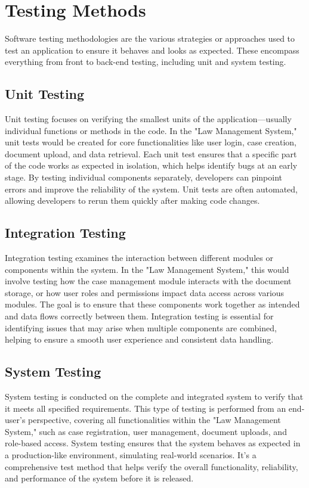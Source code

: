 \section{Testing Methods}

Software testing methodologies are the various strategies or approaches used to test an application to ensure it behaves and looks as expected. These encompass everything from front to back-end testing, including unit and system testing.

\subsection{Unit Testing}

Unit testing focuses on verifying the smallest units of the application—usually individual functions or methods in the code. In the "Law Management System," unit tests would be created for core functionalities like user login, case creation, document upload, and data retrieval. Each unit test ensures that a specific part of the code works as expected in isolation, which helps identify bugs at an early stage. By testing individual components separately, developers can pinpoint errors and improve the reliability of the system. Unit tests are often automated, allowing developers to rerun them quickly after making code changes.

\subsection{Integration Testing}

Integration testing examines the interaction between different modules or components within the system. In the "Law Management System," this would involve testing how the case management module interacts with the document storage, or how user roles and permissions impact data access across various modules. The goal is to ensure that these components work together as intended and data flows correctly between them. Integration testing is essential for identifying issues that may arise when multiple components are combined, helping to ensure a smooth user experience and consistent data handling.

\subsection{System Testing}

System testing is conducted on the complete and integrated system to verify that it meets all specified requirements. This type of testing is performed from an end-user’s perspective, covering all functionalities within the "Law Management System," such as case registration, user management, document uploads, and role-based access. System testing ensures that the system behaves as expected in a production-like environment, simulating real-world scenarios. It’s a comprehensive test method that helps verify the overall functionality, reliability, and performance of the system before it is released.

